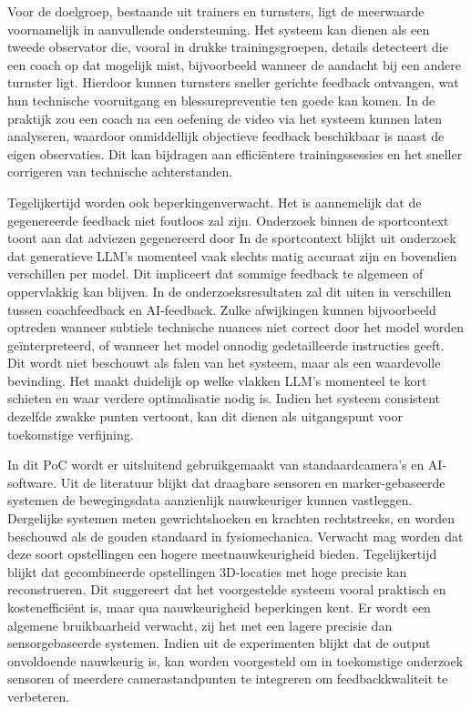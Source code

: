 Voor de doelgroep, bestaande uit trainers en turnsters, ligt de meerwaarde voornamelijk in aanvullende ondersteuning. Het systeem kan dienen als een tweede observator die, vooral in drukke trainingsgroepen, details detecteert die een coach op dat mogelijk mist, bijvoorbeeld wanneer de aandacht bij een andere turnster ligt. Hierdoor kunnen turnsters sneller gerichte feedback ontvangen, wat hun technische vooruitgang en blessurepreventie ten goede kan komen. In de praktijk zou een coach na een oefening de video via het systeem kunnen laten analyseren, waardoor onmiddellijk objectieve feedback beschikbaar is naast de eigen observaties. Dit kan bijdragen aan efficiëntere trainingssessies en het sneller corrigeren van technische achterstanden.

Tegelijkertijd worden ook beperkingen\newline verwacht. Het is aannemelijk dat de gegenereerde feedback niet foutloos zal zijn. Onderzoek binnen de sportcontext toont aan dat adviezen gegenereerd door In de sportcontext blijkt uit onderzoek dat generatieve LLM's momenteel vaak slechts matig accuraat zijn en bovendien verschillen per model. Dit impliceert dat sommige feedback te algemeen of oppervlakkig kan blijven. In de onderzoeksresultaten zal dit uiten in verschillen tussen coachfeedback en AI-feedback. Zulke afwijkingen kunnen bijvoorbeeld optreden wanneer subtiele technische nuances niet correct door het model worden geïnterpreteerd, of wanneer het model onnodig gedetailleerde instructies geeft. Dit wordt niet beschouwt als falen van het systeem, maar als een waardevolle bevinding. Het maakt duidelijk op welke vlakken LLM's momenteel te kort schieten en waar verdere optimalisatie nodig is. Indien het systeem consistent dezelfde zwakke punten vertoont, kan dit dienen als uitgangspunt voor toekomstige verfijning.

In dit PoC wordt er uitsluitend gebruikgemaakt van standaardcamera's en AI-software. Uit de literatuur blijkt dat draagbare sensoren en marker-gebaseerde systemen de bewegingsdata aanzienlijk nauwkeuriger kunnen vastleggen. Dergelijke systemen meten gewrichtshoeken en krachten rechtstreeks, en worden beschouwd als de gouden standaard in fysiomechanica. Verwacht mag worden dat deze soort opstellingen een hogere meetnauwkeurigheid bieden. Tegelijkertijd blijkt dat gecombineerde opstellingen 3D-locaties met hoge precisie kan reconstrueren. Dit suggereert dat het voorgestelde systeem vooral praktisch en kostenefficiënt is, maar qua nauwkeurigheid beperkingen kent. Er wordt een algemene bruikbaarheid verwacht, zij het met een lagere precisie dan sensorgebaseerde systemen. Indien uit de experimenten blijkt dat de output onvoldoende nauwkeurig is, kan worden voorgesteld om in toekomstige onderzoek sensoren of meerdere camerastandpunten te integreren om feedbackkwaliteit te verbeteren.

